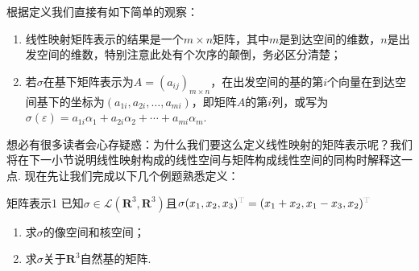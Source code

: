 根据定义我们直接有如下简单的观察：
\begin{enumerate}
    \item 线性映射矩阵表示的结果是一个$m\times n$矩阵，其中$m$是到达空间的维数，$n$是出发空间的维数，特别注意此处有个次序的颠倒，务必区分清楚；

    \item 若$\sigma$在基下矩阵表示为$A=(a_{ij})_{m\times n}$，在出发空间的基的第$i$个向量在到达空间基下的坐标为$(a_{1i},a_{2i},\ldots,a_{mi})$，即矩阵$A$的第$i$列，或写为$\sigma(\varepsilon)=a_{1i}\alpha_1+a_{2i}\alpha_2+\cdots+a_{mi}\alpha_m$.
\end{enumerate}

想必有很多读者会心存疑惑：为什么我们要这么定义线性映射的矩阵表示呢？我们将在下一小节说明线性映射构成的线性空间与矩阵构成线性空间的同构时解释这一点. 现在先让我们完成以下几个例题熟悉定义：
\begin{example}{}{矩阵表示1}
    已知$\sigma \in \mathcal{L}(\mathbf{R}^3,\mathbf{R}^3)$且$\sigma(x_1,x_2,x_3)^{\color{lightgray}\mathrm{T}}=(x_1+x_2,x_1-x_3, x_2)^{\color{lightgray}\mathrm{T}}$
    \begin{enumerate}
        \item 求$\sigma$的像空间和核空间；

        \item 求$\sigma$关于$\mathbf{R}^3$自然基的矩阵.
    \end{enumerate}
\end{example}

